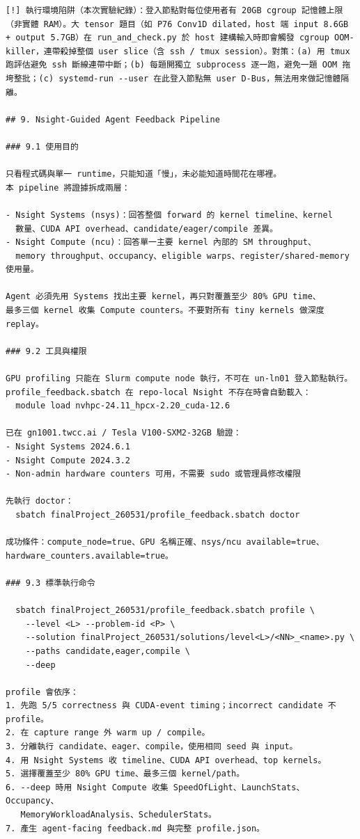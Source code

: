 \documentclass[conference]{IEEEtran}
\begin{document}
\begin{lstlisting}
[!] 執行環境陷阱（本次實驗紀錄）：登入節點對每位使用者有 20GB cgroup 記憶體上限（非實體 RAM）。大 tensor 題目（如 P76 Conv1D dilated，host 端 input 8.6GB + output 5.7GB）在 run_and_check.py 於 host 建構輸入時即會觸發 cgroup OOM-killer，連帶殺掉整個 user slice（含 ssh / tmux session）。對策：(a) 用 tmux 跑評估避免 ssh 斷線連帶中斷；(b) 每題開獨立 subprocess 逐一跑，避免一題 OOM 拖垮整批；(c) systemd-run --user 在此登入節點無 user D-Bus，無法用來做記憶體隔離。

## 9. Nsight-Guided Agent Feedback Pipeline

### 9.1 使用目的

只看程式碼與單一 runtime，只能知道「慢」，未必能知道時間花在哪裡。
本 pipeline 將證據拆成兩層：

- Nsight Systems (nsys)：回答整個 forward 的 kernel timeline、kernel
  數量、CUDA API overhead、candidate/eager/compile 差異。
- Nsight Compute (ncu)：回答單一主要 kernel 內部的 SM throughput、
  memory throughput、occupancy、eligible warps、register/shared-memory 使用量。

Agent 必須先用 Systems 找出主要 kernel，再只對覆蓋至少 80% GPU time、
最多三個 kernel 收集 Compute counters。不要對所有 tiny kernels 做深度 replay。

### 9.2 工具與權限

GPU profiling 只能在 Slurm compute node 執行，不可在 un-ln01 登入節點執行。
profile_feedback.sbatch 在 repo-local Nsight 不存在時會自動載入：
  module load nvhpc-24.11_hpcx-2.20_cuda-12.6

已在 gn1001.twcc.ai / Tesla V100-SXM2-32GB 驗證：
- Nsight Systems 2024.6.1
- Nsight Compute 2024.3.2
- Non-admin hardware counters 可用，不需要 sudo 或管理員修改權限

先執行 doctor：
  sbatch finalProject_260531/profile_feedback.sbatch doctor

成功條件：compute_node=true、GPU 名稱正確、nsys/ncu available=true、
hardware_counters.available=true。

### 9.3 標準執行命令

  sbatch finalProject_260531/profile_feedback.sbatch profile \
    --level <L> --problem-id <P> \
    --solution finalProject_260531/solutions/level<L>/<NN>_<name>.py \
    --paths candidate,eager,compile \
    --deep

profile 會依序：
1. 先跑 5/5 correctness 與 CUDA-event timing；incorrect candidate 不 profile。
2. 在 capture range 外 warm up / compile。
3. 分離執行 candidate、eager、compile，使用相同 seed 與 input。
4. 用 Nsight Systems 收 timeline、CUDA API overhead、top kernels。
5. 選擇覆蓋至少 80% GPU time、最多三個 kernel/path。
6. --deep 時用 Nsight Compute 收集 SpeedOfLight、LaunchStats、Occupancy、
   MemoryWorkloadAnalysis、SchedulerStats。
7. 產生 agent-facing feedback.md 與完整 profile.json。


\end{lstlisting}
\end{document}
